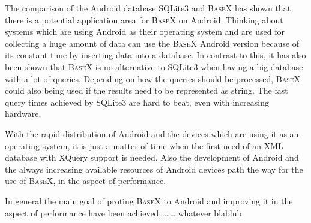 The comparison of the Android database SQLite3 and \textsc{BaseX} has shown that there is a potential application area for \textsc{BaseX} on Android.
Thinking about systems which are using Android as their operating system and are used for collecting a huge amount of data can use the \textsc{BaseX} Android version because of its constant time by inserting data into a database. 
In contrast to this, it has also been shown that \textsc{BaseX} is no alternative to SQLite3 when having a big database with a lot of queries.
Depending on how the queries should be processed, \textsc{BaseX} could also being used if the results need to be represented as string.
The fast query times achieved by SQLite3 are hard to beat, even with increasing hardware.





With the rapid distribution of Android and the devices which are using it as an operating system, it is just a matter of time when the first need of an XML database with XQuery support is needed.
Also the development of Android and the always increasing available resources of Android devices path the way for the use of \textsc{BaseX}, in the aspect of performance.



In general the main goal of proting \textsc{BaseX} to Android and improving it in the aspect of performance have been achieved\dots\dots\dots.whatever blablub


